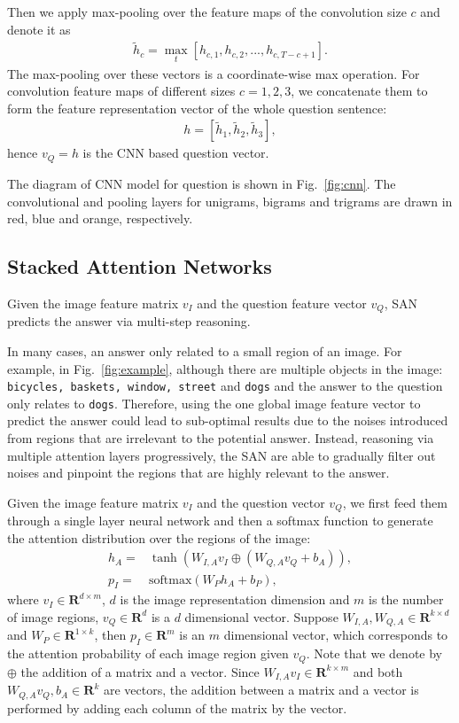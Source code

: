 \documentclass[10pt,twocolumn,letterpaper]{article}
\begin{document}
Then we apply max-pooling over the feature maps of the convolution size $c$ and
denote it as
\begin{align}
  \tilde{h}_c = \max_{t}[h_{c,1}, h_{c,2}, ..., h_{c,T-c+1}].
\end{align}
The max-pooling over these vectors is a coordinate-wise max operation.  For
convolution feature maps of different sizes $c= 1, 2, 3$, we concatenate them
to form the feature representation vector of the whole question sentence:
\begin{align}
  h = [\tilde{h}_{1}, \tilde{h}_{2}, \tilde{h}_{3}],
\end{align}
hence $v_{Q} = h$ is the CNN based question vector.

The diagram of CNN model for question is shown in Fig.~\ref{fig:cnn}. The
convolutional and pooling layers for unigrams, bigrams and trigrams are drawn
in red, blue and orange, respectively.

\subsection{Stacked Attention Networks}
\label{sec:deep_attention_network}

Given the image feature matrix $v_{I}$ and the question feature vector $v_{Q}$,
SAN predicts the answer via multi-step reasoning.

In many cases, an answer only related to a small region of an image. For
example, in Fig.~\ref{fig:example}, although there are multiple objects in the
image: \texttt{bicycles, baskets, window, street} and \texttt{dogs} and the
answer to the question only relates to \texttt{dogs}. Therefore, using the one
global image feature vector to predict the answer could lead to sub-optimal
results due to the noises introduced from regions that are irrelevant to the
potential answer. Instead, reasoning via multiple attention layers
progressively, the SAN are able to gradually filter out noises and pinpoint the
regions that are highly relevant to the answer.

Given the image feature matrix $v_{I}$ and the question vector $v_{Q}$, we
first feed them through a single layer neural network and then a softmax
function to generate the attention distribution over the regions of the image:
\begin{align}
  h_{A} =& \tanh(W_{I, A}v_{I} \oplus (W_{Q,A}v_{Q}  + b_{A})), \\
  p_{I} = &\text{softmax}(W_Ph_{A} + b_{P}),
\end{align}
where $v_{I}\in \mathbf{R}^{d\times m}$, $d$ is the image representation
dimension and $m$ is the number of image regions, $v_{Q}\in \mathbf{R}^{d}$ is
a $d$ dimensional vector. Suppose $W_{I,A} ,W_{Q,A} \in \mathbf{R}^{k\times d}$
and $W_{P}\in \mathbf{R}^{1\times k}$, then $p_{I}\in \mathbf{R}^{m}$ is an $m$
dimensional vector, which corresponds to the attention probability of each
image region given $v_{Q}$. Note that we denote by $\oplus$ the addition of a
matrix and a vector. Since $W_{I, A}v_{I}\in \mathbf{R}^{k\times m}$ and both
$W_{Q, A}v_{Q}, b_{A} \in \mathbf{R}^{k}$ are vectors, the addition between a
matrix and a vector is performed by adding each column of the matrix by the
vector.
\end{document}
